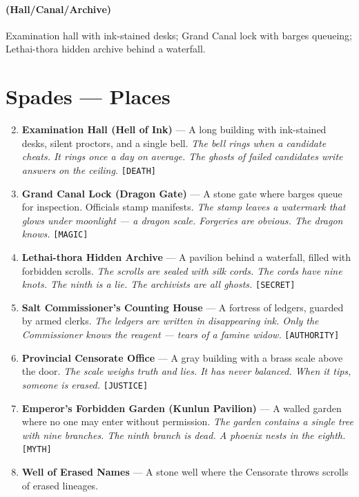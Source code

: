 \paragraph*{(Hall/Canal/Archive)} Examination hall with ink-stained desks; Grand Canal lock with barges queueing; Lethai-thora hidden archive behind a waterfall.

\section*{Spades --- Places}
\label{sec:sihai-places}
\begin{enumerate}
\setcounter{enumi}{1}
\item \textbf{Examination Hall (Hell of Ink)} --- A long building with ink-stained desks, silent proctors, and a single bell.
  \hfill \textit{The bell rings when a candidate cheats. It rings once a day on average. The ghosts of failed candidates write answers on the ceiling.} \texttt{[DEATH]}
\item \textbf{Grand Canal Lock (Dragon Gate)} --- A stone gate where barges queue for inspection. Officials stamp manifests.
  \hfill \textit{The stamp leaves a watermark that glows under moonlight --- a dragon scale. Forgeries are obvious. The dragon knows.} \texttt{[MAGIC]}
\item \textbf{Lethai-thora Hidden Archive} --- A pavilion behind a waterfall, filled with forbidden scrolls.
  \hfill \textit{The scrolls are sealed with silk cords. The cords have nine knots. The ninth is a lie. The archivists are all ghosts.} \texttt{[SECRET]}
\item \textbf{Salt Commissioner's Counting House} --- A fortress of ledgers, guarded by armed clerks.
  \hfill \textit{The ledgers are written in disappearing ink. Only the Commissioner knows the reagent --- tears of a famine widow.} \texttt{[AUTHORITY]}
\item \textbf{Provincial Censorate Office} --- A gray building with a brass scale above the door.
  \hfill \textit{The scale weighs truth and lies. It has never balanced. When it tips, someone is erased.} \texttt{[JUSTICE]}
\item \textbf{Emperor's Forbidden Garden (Kunlun Pavilion)} --- A walled garden where no one may enter without permission.
  \hfill \textit{The garden contains a single tree with nine branches. The ninth branch is dead. A phoenix nests in the eighth.} \texttt{[MYTH]}
\item \textbf{Well of Erased Names} --- A stone well where the Censorate throws scrolls of erased lineages.

\end{enumerate}
